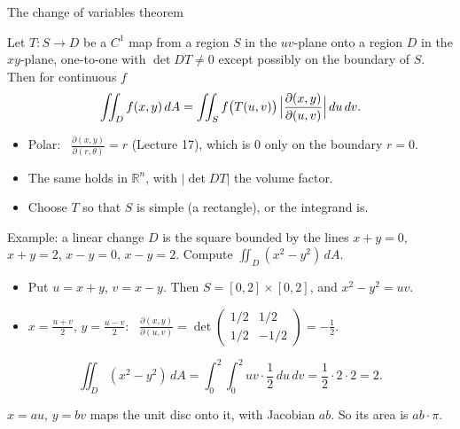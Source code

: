 \documentclass[10pt]{wosm-slides}
\newcommand{\R}{\mathbb{R}}
\newcommand{\dA}{\, dA}
\newcommand{\pd}[2]{\frac{\partial #1}{\partial #2}}
\begin{document}
\begin{frame}{The change of variables theorem}
  \begin{theorem}
    Let $T\colon S \to D$ be a $C^1$ map from a region $S$ in the $uv$-plane onto a region $D$ in the
    $xy$-plane, one-to-one with $\det DT \ne 0$ except possibly on the boundary of $S$. Then for
    continuous $f$
    \[ \iint_D f(x, y) \dA = \iint_S f\bigl(T(u, v)\bigr)\, \Bigl| \pd{(x, y)}{(u, v)} \Bigr|\, du\, dv . \]
  \end{theorem}
  \pause
  \begin{itemize}
    \item Polar: \ $\pd{(x, y)}{(r, \theta)} = r$ (Lecture 17), which is $0$ only on the boundary $r = 0$.
    \item The same holds in $\R^n$, with $|\det DT|$ the volume factor.
    \item Choose $T$ so that $S$ is simple (a rectangle), or the integrand is.
  \end{itemize}
\end{frame}

\begin{frame}{Example: a linear change}
  $D$ is the square bounded by the lines $x + y = 0$, $x + y = 2$, $x - y = 0$, $x - y = 2$.
  Compute $\iint_D (x^2 - y^2) \dA$.
  \pause
  \begin{itemize}
    \item Put $u = x + y$, $v = x - y$. Then $S = [0, 2] \times [0, 2]$, and $x^2 - y^2 = uv$.
    \item $x = \frac{u + v}{2}$, $y = \frac{u - v}{2}$: \
      $\pd{(x, y)}{(u, v)} = \det\begin{pmatrix} 1/2 & 1/2 \\ 1/2 & -1/2 \end{pmatrix} = -\frac12$.
  \end{itemize}
  \pause
  \[ \iint_D (x^2 - y^2) \dA = \int_0^2 \int_0^2 uv \cdot \frac12\, du\, dv = \frac12 \cdot 2 \cdot 2 = 2 . \]
  \pause
  \begin{example}[The ellipse $\frac{x^2}{a^2} + \frac{y^2}{b^2} \le 1$]
    $x = au$, $y = bv$ maps the unit disc onto it, with Jacobian $ab$. So its area is $ab \cdot \pi$.
  \end{example}
\end{frame}
\end{document}
